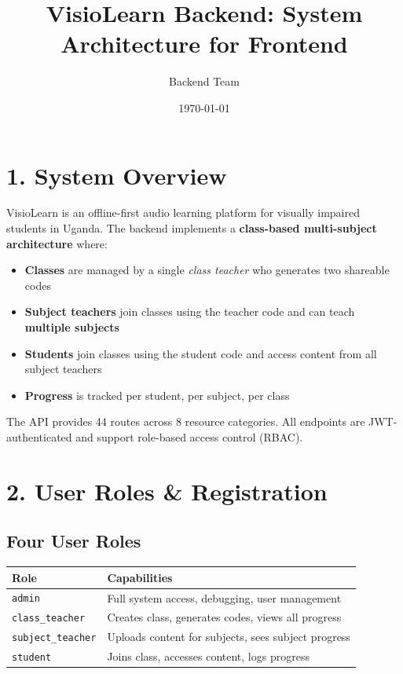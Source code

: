 \documentclass[11pt,a4paper]{article}
\title{VisioLearn Backend: System Architecture for Frontend}
\author{Backend Team}
\date{\today}
\begin{document}
\maketitle

\section*{1. System Overview}

VisioLearn is an offline-first audio learning platform for visually impaired students in Uganda. The backend implements a \textbf{class-based multi-subject architecture} where:

\begin{itemize}
    \item \textbf{Classes} are managed by a single \textit{class teacher} who generates two shareable codes
    \item \textbf{Subject teachers} join classes using the teacher code and can teach \textbf{multiple subjects}
    \item \textbf{Students} join classes using the student code and access content from all subject teachers
    \item \textbf{Progress} is tracked per student, per subject, per class
\end{itemize}

The API provides 44 routes across 8 resource categories. All endpoints are JWT-authenticated and support role-based access control (RBAC).

\section*{2. User Roles \& Registration}

\subsection*{Four User Roles}
\begin{table}[h]
\centering
\small
\begin{tabular}{|l|p{3.5cm}|}
\hline
\textbf{Role} & \textbf{Capabilities} \\
\hline
\texttt{admin} & Full system access, debugging, user management \\
\hline
\texttt{class\_teacher} & Creates class, generates codes, views all progress \\
\hline
\texttt{subject\_teacher} & Uploads content for subjects, sees subject progress \\
\hline
\texttt{student} & Joins class, accesses content, logs progress \\
\hline
\end{tabular}
\end{table}
\end{document}

